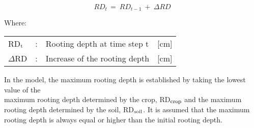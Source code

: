 \begin{equation}
RD _{t~} =~RD _{t-1} ~+~\Delta RD
\end{equation}

Where:\\[5pt]
\begin{tabularx}{\textwidth}{llXr}
	RD$_{{\rm t}}$ &:& Rooting depth at time step t   &  [cm]\\
	$\Delta$RD &:& Increase of the rooting depth    & [cm]\\
\end{tabularx}

In the model, the maximum rooting depth is established by taking the lowest value of the\\
maximum rooting depth determined by the crop, RD$_{{\rm crop}}$ and the maximum rooting depth
determined by the soil, RD$_{{\rm soil}}$. It is assumed that the maximum rooting depth is 
always equal or higher than the initial rooting depth.




